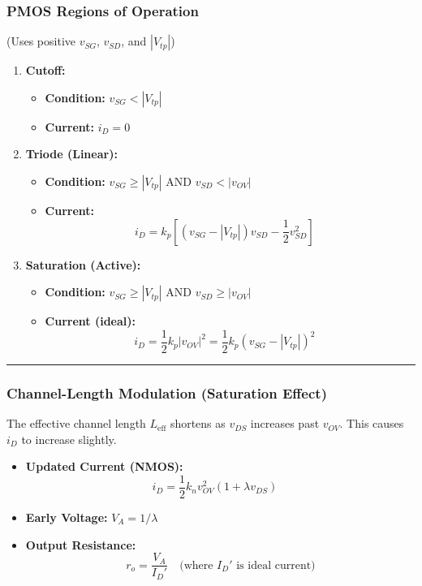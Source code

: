 \documentclass[10pt]{article}
\begin{document}
\begin{multicols}{2}
\subsubsection*{PMOS Regions of Operation}
(Uses positive $v_{SG}$, $v_{SD}$, and $|V_{tp}|$)
\begin{enumerate}
    \item \textbf{Cutoff:}
    \begin{itemize}
        \item \textbf{Condition:} \( v_{SG} < |V_{tp}| \)
        \item \textbf{Current:} \( i_D = 0 \)
    \end{itemize}
    \item \textbf{Triode (Linear):}
    \begin{itemize}
        \item \textbf{Condition:} \( v_{SG} \ge |V_{tp}| \) AND \( v_{SD} < |v_{OV}| \)
        \item \textbf{Current:} \[ i_D = k_p \left[ (v_{SG} - |V_{tp}|) v_{SD} - \frac{1}{2} v_{SD}^2 \right] \quad \text{} \]
    \end{itemize}
    \item \textbf{Saturation (Active):}
    \begin{itemize}
        \item \textbf{Condition:} \( v_{SG} \ge |V_{tp}| \) AND \( v_{SD} \ge |v_{OV}| \)
        \item \textbf{Current (ideal):} \[ i_D = \frac{1}{2} k_p |v_{OV}|^2 = \frac{1}{2} k_p (v_{SG} - |V_{tp}|)^2 \quad \text{} \]
    \end{itemize}
\end{enumerate}

\hrule

\subsubsection*{Channel-Length Modulation (Saturation Effect)}
The effective channel length $L_{\text{eff}}$ shortens as $v_{DS}$ increases past $v_{OV}$. This causes $i_D$ to increase slightly.
\begin{itemize}
    \item \textbf{Updated Current (NMOS):} \[ i_D = \frac{1}{2} k_n v_{OV}^2 (1 + \lambda v_{DS}) \quad \text{} \]
    \item \textbf{Early Voltage:} \( V_A = 1 / \lambda \)
    \item \textbf{Output Resistance:} \[ r_o = \frac{V_A}{I_D'} \quad \text{(where $I_D'$ is ideal current)} \text{} \]
\end{itemize}


\end{multicols}
\end{document}
